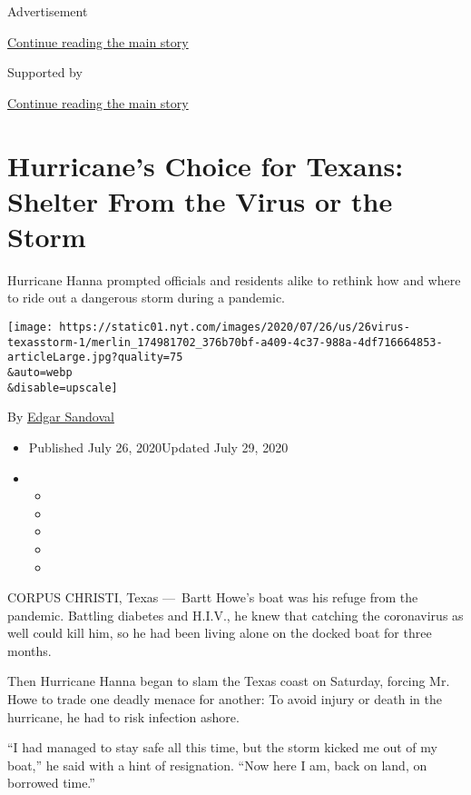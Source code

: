 Advertisement

\protect\hyperlink{after-top}{Continue reading the main story}

Supported by

\protect\hyperlink{after-sponsor}{Continue reading the main story}

\hypertarget{hurricanes-choice-for-texans-shelter-from-the-virus-or-the-storm}{%
\section{Hurricane's Choice for Texans: Shelter From the Virus or the
Storm}\label{hurricanes-choice-for-texans-shelter-from-the-virus-or-the-storm}}

Hurricane Hanna prompted officials and residents alike to rethink how
and where to ride out a dangerous storm during a pandemic.

\texttt{[image: https://static01.nyt.com/images/2020/07/26/us/26virus-texasstorm-1/merlin\_174981702\_376b70bf-a409-4c37-988a-4df716664853-articleLarge.jpg?quality=75\\\&auto=webp\\\&disable=upscale]}

By \href{https://www.nytimes.com/by/edgar-sandoval}{Edgar Sandoval}

\begin{itemize}
\item
  Published July 26, 2020Updated July 29, 2020
\item
  \begin{itemize}
  \item
  \item
  \item
  \item
  \item
  \end{itemize}
\end{itemize}

CORPUS CHRISTI, Texas ---~Bartt Howe's boat was his refuge from the
pandemic. Battling diabetes and H.I.V., he knew that catching the
coronavirus as well could kill him, so he had been living alone on the
docked boat for three months.

Then Hurricane Hanna began to slam the Texas coast on Saturday, forcing
Mr. Howe to trade one deadly menace for another: To avoid injury or
death in the hurricane, he had to risk infection ashore.

``I had managed to stay safe all this time, but the storm kicked me out
of my boat,'' he said with a hint of resignation. ``Now here I am, back
on land, on borrowed time.''

